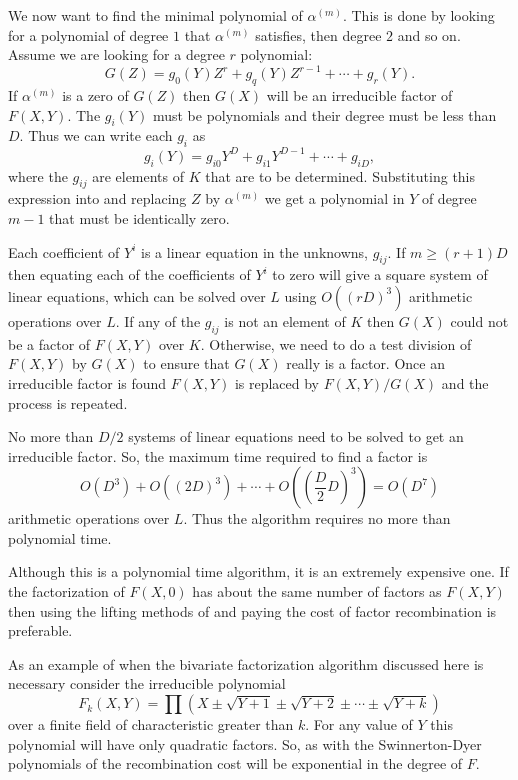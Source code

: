We now want to find the minimal polynomial of $\alpha^{(m)}$.  This is
done by looking for a polynomial of degree $1$ that $\alpha^{(m)}$
satisfies, then degree $2$ and so on.  Assume we are looking for a
degree $r$ polynomial:
\begin{equation} \label{GF:MinPoly:Eq}
G(Z) = g_0(Y) Z^r + g_q(Y) Z^{r-1} + \cdots + g_r(Y).
\end{equation}
If $\alpha^{(m)}$ is a zero of $G(Z)$ then $G(X)$ will be an
irreducible factor of $F(X, Y)$.  The $g_i(Y)$ must be polynomials and
their degree must be less than $D$.  Thus we can write each $g_i$ as 
\[
g_i(Y) = g_{i0} Y^D + g_{i1} Y^{D-1} + \cdots + g_{iD},
\]
where the $g_{ij}$ are elements of $K$ that are to be determined.
Substituting this expression into  and
replacing $Z$ by $\alpha^{(m)}$ we get a polynomial in $Y$ of degree
$m - 1$ that must be identically zero. 

Each coefficient of $Y^i$ is a linear equation in the unknowns,
$g_{ij}$.  If $m \ge (r+1)D$ then equating each of the coefficients of
$Y^i$ to zero will give a square system of linear equations, which can
be solved over $L$ using $O((rD)^3)$ arithmetic operations over $L$.
If any of the $g_{ij}$ is not an element of $K$ then $G(X)$ could not
be a factor of $F(X, Y)$ over $K$.  Otherwise, we need to do a test
division of $F(X, Y)$ by $G(X)$ to ensure that $G(X)$ really is a
factor.  Once an irreducible factor is found $F(X, Y)$ is replaced by
$F(X,Y)/G(X)$ and the process is repeated.

No more than $D/2$ systems of linear equations need to be solved to
get an irreducible factor.  So, the maximum time required to find a
factor is
\[
O(D^3) + O((2D)^3) + \cdots + O((\frac{D}{2} D)^3) = O(D^7)
\]
arithmetic operations over $L$.    Thus the algorithm requires no more
than polynomial time.

Although this is a polynomial time algorithm, it is an extremely
expensive one. If the factorization of $F(X,0)$ has about the same
number of factors as $F(X, Y)$ then using the lifting methods of
 and paying the cost of factor recombination is
preferable. 

As an example of when the bivariate factorization algorithm discussed
here is necessary consider the irreducible polynomial
\[
F_k(X, Y) = \prod \left(X \pm \sqrt{Y+1} \pm \sqrt{Y+2} \pm \cdots
\pm\sqrt{Y+k}\right)
\]
over a finite field of characteristic greater than $k$. For any value
of $Y$ this polynomial will have only quadratic factors.  So, as with
the Swinnerton-Dyer polynomials of
 the recombination cost will be exponential in
the degree of $F$.


